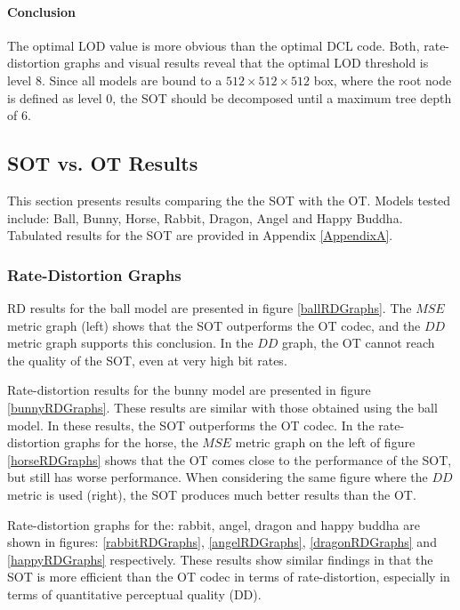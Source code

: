 \paragraph{Conclusion}

The optimal LOD value is more obvious than the optimal DCL code. Both, rate-distortion graphs and visual results reveal that the optimal LOD threshold is level $8$. Since all models are bound to a $512\times 512 \times 512$ box, where the root node is defined as level $0$, the SOT should be decomposed until a maximum tree depth of $6$.

\subsection{SOT vs. OT Results}

This section presents results comparing the the SOT with the OT. Models tested include: Ball, Bunny, Horse, Rabbit, Dragon, Angel and Happy Buddha. Tabulated results for the SOT are provided in Appendix \ref{AppendixA}.

\subsubsection{Rate-Distortion Graphs}

RD results for the ball model are presented in figure \ref{ballRDGraphs}. The $MSE$ metric graph (left) shows that the SOT outperforms the OT codec, and the $DD$ metric graph supports this conclusion. In the $DD$ graph, the OT cannot reach the quality of the SOT, even at very high bit rates.

Rate-distortion results for the bunny model are presented in figure \ref{bunnyRDGraphs}. These results are similar with those obtained using the ball model. In these results, the SOT outperforms the OT codec. In the rate-distortion graphs for the horse, the $MSE$ metric graph on the left of figure \ref{horseRDGraphs} shows that the OT comes close to the performance of the SOT, but still has worse performance. When considering the same figure where the $DD$ metric is used (right), the SOT produces much better results than the OT.

Rate-distortion graphs for the: rabbit, angel, dragon and happy buddha are shown in figures: \ref{rabbitRDGraphs}, \ref{angelRDGraphs}, \ref{dragonRDGraphs} and \ref{happyRDGraphs} respectively. These results show similar findings in that the SOT is more efficient than the OT codec in terms of rate-distortion, especially in terms of quantitative perceptual quality (DD).

